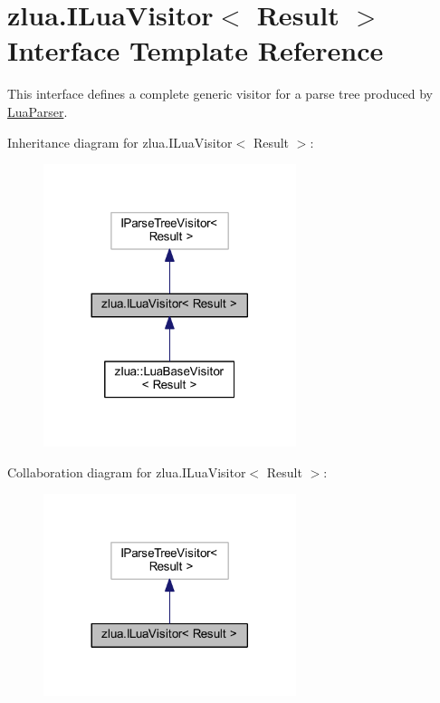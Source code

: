 \hypertarget{interfacezlua_1_1_i_lua_visitor}{}\section{zlua.\+I\+Lua\+Visitor$<$ Result $>$ Interface Template Reference}
\label{interfacezlua_1_1_i_lua_visitor}


This interface defines a complete generic visitor for a parse tree produced by \mbox{\hyperlink{classzlua_1_1_lua_parser}{Lua\+Parser}}.  




Inheritance diagram for zlua.\+I\+Lua\+Visitor$<$ Result $>$\+:
\nopagebreak
\begin{figure}[H]
\begin{center}
\leavevmode
\includegraphics[width=209pt]{interfacezlua_1_1_i_lua_visitor__inherit__graph}
\end{center}
\end{figure}


Collaboration diagram for zlua.\+I\+Lua\+Visitor$<$ Result $>$\+:
\nopagebreak
\begin{figure}[H]
\begin{center}
\leavevmode
\includegraphics[width=209pt]{interfacezlua_1_1_i_lua_visitor__coll__graph}
\end{center}
\end{figure}
